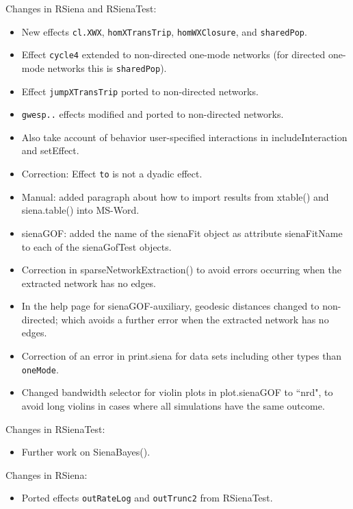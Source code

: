 \documentclass[a4paper,fleqn,11pt]{article}
\newcommand{\+}{\, + \,}
\newcommand{\sfn}[1]{\textsf{#1}}
\begin{document}
\begin{small}
\begin{itemize}
Changes in RSiena and RSienaTest:
\begin{itemize}
\item New effects \texttt{cl.XWX}, \texttt{homXTransTrip},
    \texttt{homWXClosure}, and \texttt{sharedPop}.
 \item Effect \texttt{cycle4} extended to non-directed one-mode networks
    (for directed one-mode networks this is \texttt{sharedPop}).
 \item Effect \texttt{jumpXTransTrip} ported to non-directed networks.
 \item \texttt{gwesp..}  effects modified and ported to non-directed networks.
 \item Also take account of behavior user-specified interactions in
     \sfn{includeInteraction} and \sfn{setEffect}.
 \item Correction: Effect \texttt{to} is not a dyadic effect.
 \item Manual: added paragraph about how to import results from
     \sfn{xtable()} and \sfn{siena.table()} into MS-Word.
 \item \sfn{sienaGOF}: added the name of the \sfn{sienaFit} object
     as attribute \sfn{sienaFitName} to each of the \sfn{sienaGofTest} objects.
 \item Correction in \sfn{sparseNetworkExtraction()} to avoid errors occurring
     when the extracted network has no edges.
 \item In the help page for \sfn{sienaGOF-auxiliary}, geodesic distances
     changed to non-directed; which avoids a further error
     when the extracted network has no edges.
 \item Correction of an error in \sfn{print.siena} for data sets including
     other types than \texttt{oneMode}.
 \item Changed bandwidth selector for violin plots in \sfn{plot.sienaGOF} to ``nrd",
     to avoid long violins in cases where all simulations have the same outcome.
\end{itemize}

Changes in RSienaTest:
\begin{itemize}
\item Further work on \sfn{SienaBayes()}.
\end{itemize}

Changes in RSiena:
\begin{itemize}
  \item Ported effects \texttt{outRateLog} and \texttt{outTrunc2} from RSienaTest.
\end{itemize}


\end{itemize}
\end{small}
\end{document}

